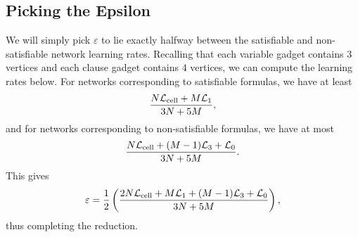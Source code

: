 \subsection{Picking the Epsilon}
We will simply pick $\varepsilon$ to lie exactly halfway between the satisfiable and non-satisfiable network learning rates. Recalling that each variable gadget contains $3$ vertices and each clause gadget contains $4$ vertices, we can compute the learning rates below. For networks corresponding to satisfiable formulas, we have at least
\begin{align*}
    \frac{N\mathcal{L}_{\text{cell}} + M\mathcal{L}_1}{3N + 5M},
\end{align*}
and for networks corresponding to non-satisfiable formulas, we have at most
\begin{align*}
    \frac{N\mathcal{L}_{\text{cell}} + (M-1)\mathcal{L}_3 + \mathcal{L}_0}{3N + 5M}.
\end{align*}
This gives 
\begin{align*}
    \varepsilon = \frac{1}{2}\left(\frac{2N\mathcal{L}_{\text{cell}} + M\mathcal{L}_1 + (M-1)\mathcal{L}_3 + \mathcal{L}_0}{3N + 5M}\right),
\end{align*}
thus completing the reduction. 
